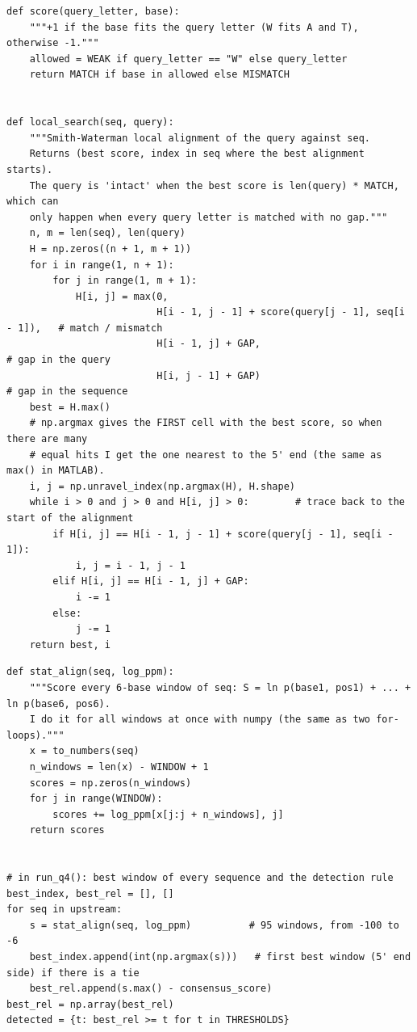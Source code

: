 \documentclass[11pt,a4paper]{article}
\begin{document}
\begin{lstlisting}[caption={Q1: Smith--Waterman local search with the W letter (from \texttt{q1\_local\_search.py}).}]
def score(query_letter, base):
    """+1 if the base fits the query letter (W fits A and T), otherwise -1."""
    allowed = WEAK if query_letter == "W" else query_letter
    return MATCH if base in allowed else MISMATCH


def local_search(seq, query):
    """Smith-Waterman local alignment of the query against seq.
    Returns (best score, index in seq where the best alignment starts).
    The query is 'intact' when the best score is len(query) * MATCH, which can
    only happen when every query letter is matched with no gap."""
    n, m = len(seq), len(query)
    H = np.zeros((n + 1, m + 1))
    for i in range(1, n + 1):
        for j in range(1, m + 1):
            H[i, j] = max(0,
                          H[i - 1, j - 1] + score(query[j - 1], seq[i - 1]),   # match / mismatch
                          H[i - 1, j] + GAP,                                   # gap in the query
                          H[i, j - 1] + GAP)                                   # gap in the sequence
    best = H.max()
    # np.argmax gives the FIRST cell with the best score, so when there are many
    # equal hits I get the one nearest to the 5' end (the same as max() in MATLAB).
    i, j = np.unravel_index(np.argmax(H), H.shape)
    while i > 0 and j > 0 and H[i, j] > 0:        # trace back to the start of the alignment
        if H[i, j] == H[i - 1, j - 1] + score(query[j - 1], seq[i - 1]):
            i, j = i - 1, j - 1
        elif H[i, j] == H[i - 1, j] + GAP:
            i -= 1
        else:
            j -= 1
    return best, i
\end{lstlisting}

\begin{lstlisting}[caption={Q4: statistical alignment with the PPM (from \texttt{q4\_statistical\_alignment.py}; log\_ppm is the natural log of the PPM).}]
def stat_align(seq, log_ppm):
    """Score every 6-base window of seq: S = ln p(base1, pos1) + ... + ln p(base6, pos6).
    I do it for all windows at once with numpy (the same as two for-loops)."""
    x = to_numbers(seq)
    n_windows = len(x) - WINDOW + 1
    scores = np.zeros(n_windows)
    for j in range(WINDOW):
        scores += log_ppm[x[j:j + n_windows], j]
    return scores


# in run_q4(): best window of every sequence and the detection rule
best_index, best_rel = [], []
for seq in upstream:
    s = stat_align(seq, log_ppm)          # 95 windows, from -100 to -6
    best_index.append(int(np.argmax(s)))   # first best window (5' end side) if there is a tie
    best_rel.append(s.max() - consensus_score)
best_rel = np.array(best_rel)
detected = {t: best_rel >= t for t in THRESHOLDS}
\end{lstlisting}
\end{document}
